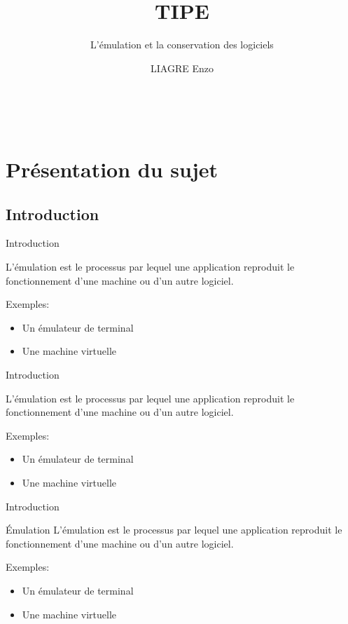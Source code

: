 \documentclass{beamer}
\title{TIPE}
\author{L'émulation et la conservation des logiciels}
\institute{}
\date{\scriptsize LIAGRE Enzo}
\begin{document}
    
    \begin{frame}
        \titlepage\
    \end{frame}

    
    
    \section{Présentation du sujet}
    \subsection{Introduction}
    \begin{frame}{Introduction}
        \begin{definition}[Émulation]
            L'émulation est le processus par lequel une application reproduit le fonctionnement d'une machine ou d'un autre logiciel.
        \end{definition}
        \color{white} Exemples:
        \begin{itemize}
            \item[\color{white}] \color{white} Un émulateur de terminal
            \item[\color{white}] \color{white} Une machine virtuelle
        \end{itemize}
    \end{frame}

    \begin{frame}{Introduction}
        \begin{definition}[Émulation]
            L'émulation est le processus par lequel une application reproduit le fonctionnement d'une machine ou d'un autre logiciel.
        \end{definition}
        Exemples:
        \begin{itemize}
            \item Un émulateur de terminal
            \item[\color{white}] \color{white} Une machine virtuelle
        \end{itemize}
    \end{frame}

    \begin{frame}{Introduction}
        \begin{block}{Émulation}
            L'émulation est le processus par lequel une application reproduit le fonctionnement d'une machine ou d'un autre logiciel.
        \end{block}
        Exemples:
        \begin{itemize}
            \item Un émulateur de terminal
            \item Une machine virtuelle
        \end{itemize}
    \end{frame}
\end{document}
